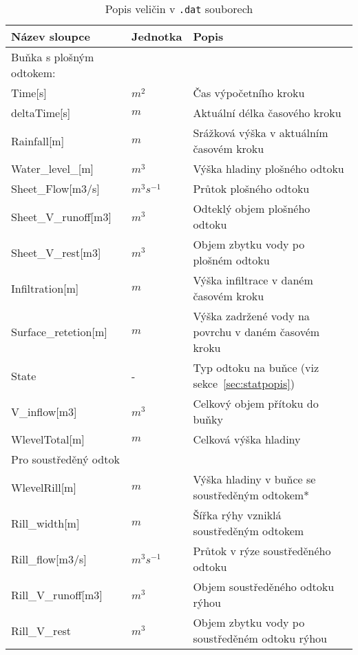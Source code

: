 \begin{table}[h!]
 

 \centering
 \caption{Popis veličin  v {\tt.dat} souborech}
\label{tab:vystupydat}

 \begin{tabular}{llp{}}
  \hline  \hline
 Název sloupce    & Jednotka    & Popis       \\ 
 \hline
 Buňka s plošným odtokem:	 &&\\ \hline
 Time[s]          &   $m^2$      &  Čas výpočetního kroku          \\
 deltaTime[s]     &   $m$        &  Aktuální délka časového kroku  \\
 Rainfall[m]      &  $m$         &  Srážková výška v aktuálním časovém kroku \\
 Water\_level\_[m]       &  $m^3$  & Výška hladiny plošného odtoku \\
 Sheet\_Flow[m3/s]       &  $m^3s^{-1}$  & Průtok plošného odtoku  \\
 Sheet\_V\_runoff[m3]    &  $m^3$     & Odteklý objem plošného odtoku \\
 Sheet\_V\_rest[m3]      &  $m^3$     & Objem zbytku vody po plošném odtoku \\
 Infiltration[m]         &  $m$      & Výška infiltrace v daném časovém kroku \\
 Surface\_retetion[m]    &  $m$      & Výška zadržené vody na povrchu v daném časovém kroku \\
 State                   &  -         & Typ odtoku na buňce (viz sekce~\ref{sec:statpopis})  \\
 V\_inflow[m3]   &   $m^3$ &  Celkový objem přítoku do buňky \\
 WlevelTotal[m]	  &   $m$	&  Celková výška hladiny  \\  \hline
 Pro soustředěný odtok &&\\ \hline 
 WlevelRill[m]         &   $m$       &  Výška hladiny v buňce se soustředěným odtokem* \\
 Rill\_width[m]	       &   $m$ &  Šířka rýhy vzniklá soustředěným odtokem\\
 Rill\_flow[m3/s]      &   $m^3s^{-1}$       &  Průtok v rýze soustředěného odtoku \\
 Rill\_V\_runoff[m3]   &   $m^3$  &   Objem soustředěného odtoku rýhou \\
 Rill\_V\_rest   &  $m^3$ &   Objem zbytku vody po soustředěném odtoku rýhou  \\

\end{tabular}
\end{table}
